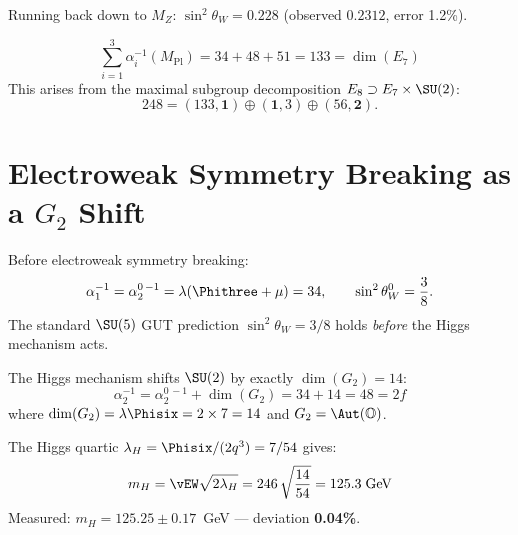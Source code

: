 Running back down to $M_Z$: $\sin^2\theta_W = 0.228$
(observed $0.2312$, error 1.2\%).

\begin{theorem}
\begin{equation}
\boxed{\sum_{i=1}^{3}\alpha_i^{-1}(M_{\mathrm{Pl}}) = 34+48+51 = 133 = \dim(E_7)}
\end{equation}
This arises from the maximal subgroup decomposition
$E_8\supset E_7\times\SU(2)$:
\begin{equation}
248 = (133,\mathbf{1})\oplus(\mathbf{1},3)\oplus(56,\mathbf{2}).
\end{equation}
\end{theorem}


\section{\texorpdfstring{Electroweak Symmetry Breaking as a $G_2$ Shift}{Electroweak Symmetry Breaking as a G2 Shift}}
\label{sec:ewsb-g2}

\begin{theorem}
Before electroweak symmetry breaking:
\begin{equation}
\alpha_1^{-1} = \alpha_2^{0\,-1} = \lambda(\Phithree+\mu) = 34,
\qquad
\sin^2\theta_W^{0} = \frac{3}{8}.
\end{equation}
The standard $\SU(5)$ GUT prediction $\sin^2\theta_W = 3/8$
holds \emph{before} the Higgs mechanism acts.
\end{theorem}

\begin{theorem}[EWSB Shift $=\dim(G_2)$]
The Higgs mechanism shifts $\SU(2)$ by exactly $\dim(G_2)=14$:
\begin{equation}
\boxed{\alpha_2^{-1} = \alpha_2^{0\,-1} + \dim(G_2) = 34 + 14 = 48 = 2f}
\end{equation}
where $\dim(G_2)=\lambda\Phisix = 2\times 7 = 14$ and $G_2=\Aut(\mathbb{O})$.
\end{theorem}

\begin{corollary}
The Higgs quartic $\lambda_H = \Phisix/(2q^3)=7/54$ gives:
\begin{equation}
m_H = \vEW\sqrt{2\lambda_H} = 246\,\sqrt{\frac{14}{54}} = 125.3\;\mathrm{GeV}
\end{equation}
Measured: $m_H = 125.25\pm 0.17$~GeV --- deviation \textbf{0.04\%}.
\end{corollary}


